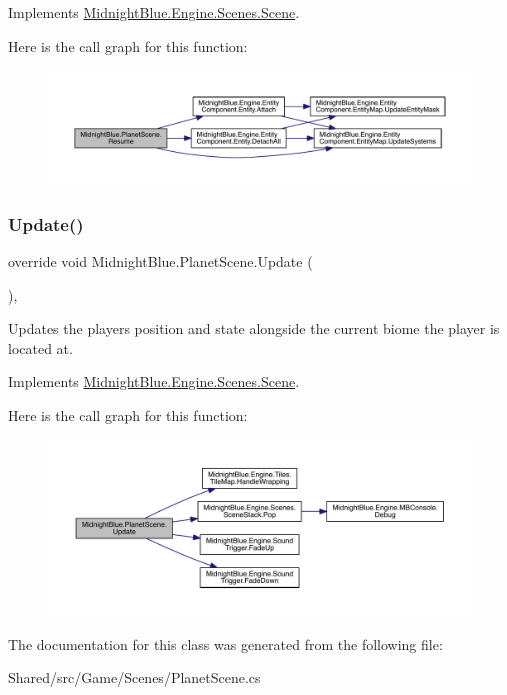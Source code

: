 Implements \hyperlink{class_midnight_blue_1_1_engine_1_1_scenes_1_1_scene_ab7cd837b20785116007a4732d90bc548}{Midnight\+Blue.\+Engine.\+Scenes.\+Scene}.

Here is the call graph for this function\+:
\nopagebreak
\begin{figure}[H]
\begin{center}
\leavevmode
\includegraphics[width=350pt]{class_midnight_blue_1_1_planet_scene_aa14750d3675b59462796e821b3921397_cgraph}
\end{center}
\end{figure}
\hypertarget{class_midnight_blue_1_1_planet_scene_add0a85b4f754f026231aa7269259c65c}{}\label{class_midnight_blue_1_1_planet_scene_add0a85b4f754f026231aa7269259c65c} 
\subsubsection{\texorpdfstring{Update()}{Update()}}
{\footnotesize\ttfamily override void Midnight\+Blue.\+Planet\+Scene.\+Update (\begin{DoxyParamCaption}{ }\end{DoxyParamCaption})\hspace{0.3cm}{\ttfamily [inline]}, {\ttfamily [virtual]}}



Updates the players position and state alongside the current biome the player is located at. 



Implements \hyperlink{class_midnight_blue_1_1_engine_1_1_scenes_1_1_scene_a4e37ff3d5362a8ad5c0d82d7c990dfdf}{Midnight\+Blue.\+Engine.\+Scenes.\+Scene}.

Here is the call graph for this function\+:
\nopagebreak
\begin{figure}[H]
\begin{center}
\leavevmode
\includegraphics[width=350pt]{class_midnight_blue_1_1_planet_scene_add0a85b4f754f026231aa7269259c65c_cgraph}
\end{center}
\end{figure}


The documentation for this class was generated from the following file\+:\begin{DoxyCompactItemize}
\item 
Shared/src/\+Game/\+Scenes/Planet\+Scene.\+cs\end{DoxyCompactItemize}
